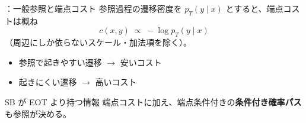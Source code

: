 \assuppl
\begin{frame}{\supplmark：一般参照と端点コスト}
    参照過程の遷移密度を $p_T(y\mid x)$ とすると、端点コストは概ね
    \[
        c(x,y)\;\propto\; -\log p_T(y\mid x)
    \]
    （周辺にしか依らないスケール・加法項を除く）。
    \begin{itemize}
        \item 参照で起きやすい遷移 $\to$ 安いコスト
        \item 起きにくい遷移 $\to$ 高いコスト
    \end{itemize}
    \begin{exampleblock}{SB が EOT より持つ情報}
        端点コストに加え、端点条件付きの\textbf{条件付き確率パス}も参照が決める。
    \end{exampleblock}
\end{frame}
